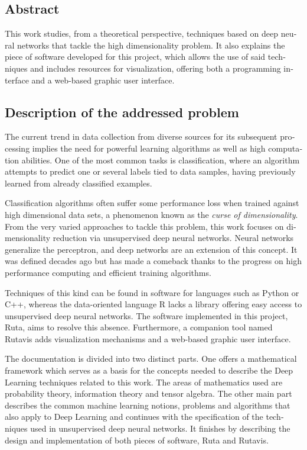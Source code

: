 \begin{otherlanguage}{american}
\chapter*{Abstract}

This work studies, from a theoretical perspective, techniques based on deep neural networks that tackle the high dimensionality problem. It also explains the piece of software developed for this project, which allows the use of said techniques and includes resources for visualization, offering both a programming interface and a web-based graphic user interface.

\section*{Description of the addressed problem}

The current trend in data collection from diverse sources for its subsequent processing implies the need for powerful learning algorithms as well as high computation abilities. One of the most common tasks is classification, where an algorithm attempts to predict one or several labels tied to data samples, having previously learned from already classified examples.

Classification algorithms often suffer some performance loss when trained against high dimensional data sets, a phenomenon known as the \emph{curse of dimensionality}. From the very varied approaches to tackle this problem, this work focuses on dimensionality reduction via unsupervised deep neural networks. Neural networks generalize the perceptron, and deep networks are an extension of this concept. It was defined decades ago but has made a comeback thanks to the progress on high performance computing and efficient training algorithms.

Techniques of this kind can be found in software for languages such as Python or C++, whereas the data-oriented language R lacks a library offering easy access to unsupervised deep neural networks. The software implemented in this project, Ruta, aims to resolve this absence. Furthermore, a companion tool named Rutavis adds visualization mechanisms and a web-based graphic user interface.

The documentation is divided into two distinct parts. One offers a mathematical framework which serves as a basis for the concepts needed to describe the Deep Learning techniques related to this work. The areas of mathematics used are probability theory, information theory and tensor algebra. The other main part describes the common machine learning notions, problems and algorithms that also apply to Deep Learning and continues with the specification of the techniques used in unsupervised deep neural networks. It finishes by describing the design and implementation of both pieces of software, Ruta and Rutavis.


\end{otherlanguage}
